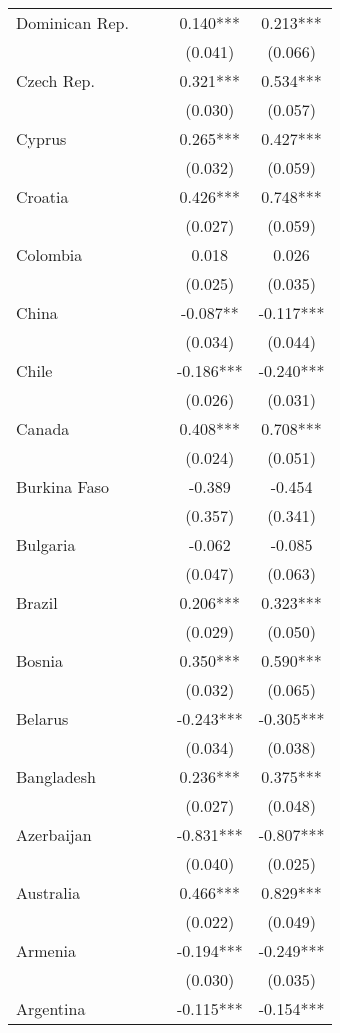 \documentclass[]{article}
\begin{document}
\begin{tabular}{lcccc}
Dominican Rep. &  &  & 0.140*** & 0.213*** \\
 &  &  & (0.041) & (0.066) \\
Czech Rep. &  &  & 0.321*** & 0.534*** \\
 &  &  & (0.030) & (0.057) \\
Cyprus &  &  & 0.265*** & 0.427*** \\
 &  &  & (0.032) & (0.059) \\
Croatia &  &  & 0.426*** & 0.748*** \\
 &  &  & (0.027) & (0.059) \\
Colombia &  &  & 0.018 & 0.026 \\
 &  &  & (0.025) & (0.035) \\
China &  &  & -0.087** & -0.117*** \\
 &  &  & (0.034) & (0.044) \\
Chile &  &  & -0.186*** & -0.240*** \\
 &  &  & (0.026) & (0.031) \\
Canada &  &  & 0.408*** & 0.708*** \\
 &  &  & (0.024) & (0.051) \\
Burkina Faso &  &  & -0.389 & -0.454 \\
 &  &  & (0.357) & (0.341) \\
Bulgaria &  &  & -0.062 & -0.085 \\
 &  &  & (0.047) & (0.063) \\
Brazil &  &  & 0.206*** & 0.323*** \\
 &  &  & (0.029) & (0.050) \\
Bosnia &  &  & 0.350*** & 0.590*** \\
 &  &  & (0.032) & (0.065) \\
Belarus &  &  & -0.243*** & -0.305*** \\
 &  &  & (0.034) & (0.038) \\
Bangladesh &  &  & 0.236*** & 0.375*** \\
 &  &  & (0.027) & (0.048) \\
Azerbaijan &  &  & -0.831*** & -0.807*** \\
 &  &  & (0.040) & (0.025) \\
Australia &  &  & 0.466*** & 0.829*** \\
 &  &  & (0.022) & (0.049) \\
Armenia &  &  & -0.194*** & -0.249*** \\
 &  &  & (0.030) & (0.035) \\
Argentina &  &  & -0.115*** & -0.154*** \\

\end{tabular}
\end{document}
